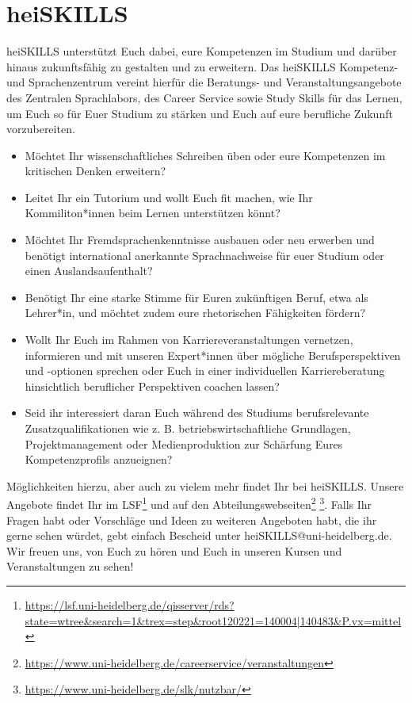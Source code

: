 \section{heiSKILLS}

heiSKILLS unterstützt Euch dabei, eure Kompetenzen im Studium und darüber hinaus zukunftsfähig zu gestalten und zu erweitern. Das heiSKILLS Kompetenz- und Sprachenzentrum vereint hierfür die Beratungs- und Veranstaltungsangebote des Zentralen Sprachlabors, des Career Service sowie Study Skills für das Lernen, um Euch so für Euer Studium zu stärken und Euch auf eure berufliche Zukunft vorzubereiten.
\begin{itemize}
  
  \item Möchtet Ihr wissenschaftliches Schreiben üben oder eure Kompetenzen im kritischen Denken erweitern?
  \item Leitet Ihr ein Tutorium und wollt Euch fit machen, wie Ihr Kommiliton*innen beim Lernen unterstützen könnt?
  \item Möchtet Ihr Fremdsprachenkenntnisse ausbauen oder neu erwerben und benötigt international anerkannte Sprachnachweise für euer Studium oder einen Auslandsaufenthalt?
  \item Benötigt Ihr eine starke Stimme für Euren zukünftigen Beruf, etwa als Lehrer*in, und möchtet zudem eure rhetorischen Fähigkeiten fördern?
  \item Wollt Ihr Euch im Rahmen von Karriereveranstaltungen vernetzen, informieren und mit unseren Expert*innen über mögliche Berufsperspektiven und -optionen sprechen oder Euch in einer individuellen Karriereberatung hinsichtlich beruflicher Perspektiven coachen lassen?
  \item Seid ihr interessiert daran Euch während des Studiums berufsrelevante Zusatzqualifikationen wie z. B. betriebswirtschaftliche Grundlagen, Projektmanagement oder Medienproduktion zur Schärfung Eures Kompetenzprofils anzueignen?
  
\end{itemize}

Möglichkeiten hierzu, aber auch zu vielem mehr findet Ihr bei heiSKILLS.
Unsere Angebote findet Ihr im LSF\footnote{\url{https://lsf.uni-heidelberg.de/qisserver/rds?state=wtree&search=1&trex=step&root120221=140004|140483&P.vx=mittel}} und auf den Abteilungswebseiten\footnote{\url{https://www.uni-heidelberg.de/careerservice/veranstaltungen}} \footnote{\url{https://www.uni-heidelberg.de/slk/nutzbar/}}.
Falls Ihr Fragen habt oder Vorschläge und Ideen zu weiteren Angeboten habt, die ihr gerne sehen würdet, gebt einfach Bescheid unter heiSKILLS@uni-heidelberg.de. Wir freuen uns, von Euch zu hören und Euch in unseren Kursen und Veranstaltungen zu sehen!
